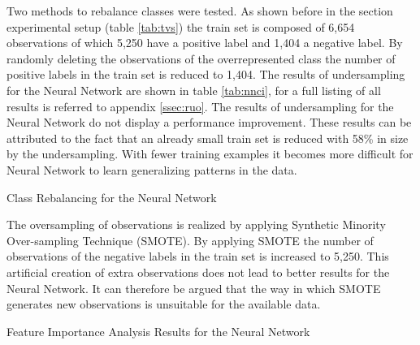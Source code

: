 Two methods to rebalance classes were tested. 
As shown before in the section experimental setup (table \ref{tab:tvs}) the train set is composed of 6,654 observations of which 5,250 have a positive label and 1,404 a negative label.
By randomly deleting the observations of the overrepresented class the number of positive labels in the train set is reduced to 1,404.
The results of undersampling for the Neural Network are shown in table \ref{tab:nnci}, for a full listing of all results is referred to appendix \ref{ssec:ruo}.
The results of undersampling for the Neural Network do not display a performance improvement.
These  results can be attributed to the fact that an already small train set is reduced with 58\% in size by the undersampling.
With fewer training examples it becomes more difficult for Neural Network to learn generalizing patterns in the data.

\begin{table}[h]
\begin{footnotesize}

\end{footnotesize}
\caption{\footnotesize{\label{tab:nnci} Class Rebalancing for the Neural Network}}
\end{table}

The oversampling of observations is realized by applying Synthetic Minority Over-sampling Technique (SMOTE). 
By applying SMOTE the number of observations of the negative labels in the train set is increased to 5,250. 
This artificial creation of extra observations does not lead to better results for the Neural Network.
It can therefore be argued that the way in which SMOTE generates new observations is unsuitable for the available data.

\begin{table}[h]
\begin{footnotesize}

\end{footnotesize}
\caption{\label{tab:nnfi} \footnotesize{Feature Importance Analysis Results for the Neural Network}}
\end{table}

